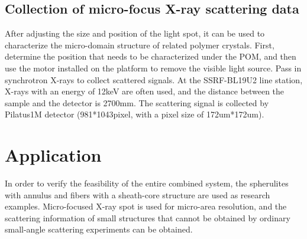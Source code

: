 \documentclass{Head}
\begin{document}
\subsection{Collection of micro-focus X-ray scattering data}
After adjusting the size and position of the light spot, it can be used to characterize the micro-domain structure of related polymer crystals.
First, determine the position that needs to be characterized under the POM, and then use the motor installed on the platform to remove the visible light source. Pass in synchrotron X-rays to collect scattered signals.
At the SSRF-BL19U2 line station, X-rays with an energy of 12keV are often used, and the distance between the sample and the detector is 2700mm.
The scattering signal is collected by Pilatus1M detector (981*1043pixel, with a pixel size of 172um*172um).


\section{Application}
In order to verify the feasibility of the entire combined system, the spherulites with annulus and fibers with a sheath-core structure are used as research examples.
Micro-focused X-ray spot is used for micro-area resolution, and the scattering information of small structures that cannot be obtained by ordinary small-angle scattering experiments can be obtained.
\end{document}
